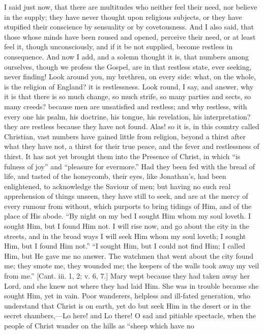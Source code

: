I said just now, that there are multitudes who neither feel their
need, nor believe in the supply; they have never thought upon
religious subjects, or they have stupified their conscience by
sensuality or by covetousness. And I also said, that those whose minds
have been roused and opened, perceive their need, or at least feel it,
though unconsciously, and if it be not supplied, become restless in
consequence. And now I add, and a solemn thought it is, that numbers
among ourselves, though we profess the Gospel, are in that restless
state, ever seeking, never finding! Look around you, my brethren, on
every side: what, on the whole, is the religion of England? it is
restlessness. Look round, I say, and answer, why it is that there is
so much change, so much strife, so many parties and sects, so many
creeds? because men are unsatisfied and restless; and why restless,
with every one his psalm, his doctrine, his tongue, his revelation,
his interpretation? they are restless because they have not found.
Alas! so it is, in this country called Christian, vast numbers have
gained little from religion, beyond a thirst after what they have not,
a thirst for their true peace, and the fever and restlessness of
thirst. It has not yet brought them into the Presence of Christ, in
which ``is fulness of joy'' and ``pleasure for
evermore.'' Had they been fed with the bread of life, and tasted
of the honeycomb, their eyes, like Jonathan's, had been enlightened,
to acknowledge the Saviour of men; but having no such real
apprehension of things unseen, they have still to seek, and are at the
mercy of every rumour from without, which purports to bring tidings of
Him, and of the place of His abode. ``By night on my bed I sought
Him whom my soul loveth. I sought Him, but I found Him not. I will
rise now, and go about the city in the streets, and in the broad ways
I will seek Him whom my soul loveth; I sought Him, but I found Him
not.'' ``I sought Him, but I could not find Him; I called Him,
but He gave me no answer. The watchmen that went about the city found
me; they smote me, they wounded me; the keepers of the walls took away
my veil from me.'' [Cant. iii. 1, 2; v. 6, 7.] Mary wept because
they had taken away her Lord, and she knew not where they had laid
Him. She was in trouble because she sought Him, yet in vain. Poor
wanderers, helpless and ill-fated generation, who understand that
Christ is on earth, yet do but seek Him in the desert or in the secret
chambers,—Lo here! and Lo there! O sad and pitiable spectacle, when
the people of Christ wander on the hills as ``sheep which have no

